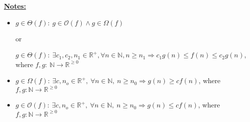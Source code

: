 \documentclass[12pt]{article}
\begin{document}
\bigskip

\underline{\textbf{Notes:}}

\bigskip

\begin{itemize}
    \item
    $g \in \Theta(f):\: g \in \mathcal{O}(f) \land g \in \Omega(f)$

    or

    $g \in \Theta(f):\:\exists c_1,c_2,n_1 \in \mathbb{R}^{+}, \forall n \in \mathbb{N}, n \geq n_1
    \Rightarrow c_1g(n) \leq f(n) \leq c_2g(n)$, where $f,g:\:\mathbb{N} \to \mathbb{R}^{\geq 0}$

    \item
    $g \in \Omega(f):\:\exists c,n_o \in \mathbb{R}^{+},\:\forall n \in
    \mathbb{N},\:n \geq n_0 \Rightarrow g(n) \geq cf(n)$, where $f,g:\mathbb{N} \to \mathbb{R}^{\geq 0}$

    \item

    $g \in \mathcal{O}(f):\:\exists c,n_o \in \mathbb{R}^{+},\:\forall n \in
    \mathbb{N},\:n \geq n_0 \Rightarrow g(n) \leq cf(n)$, where $f,g:\mathbb{N} \to \mathbb{R}^{\geq 0}$
\end{itemize}
\end{document}
